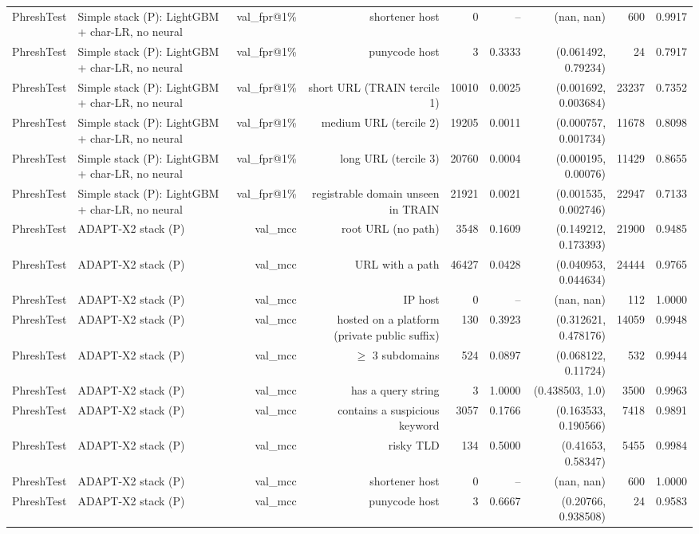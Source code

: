 \begin{table}[t]
\begin{tabular}{llrrrrrrr}
PhreshTest & Simple stack (P): LightGBM + char-LR, no neural & val\_fpr@1\% & shortener host & 0 & -- & (nan, nan) & 600 & 0.9917 \\
PhreshTest & Simple stack (P): LightGBM + char-LR, no neural & val\_fpr@1\% & punycode host & 3 & 0.3333 & (0.061492, 0.79234) & 24 & 0.7917 \\
PhreshTest & Simple stack (P): LightGBM + char-LR, no neural & val\_fpr@1\% & short URL (TRAIN tercile 1) & 10010 & 0.0025 & (0.001692, 0.003684) & 23237 & 0.7352 \\
PhreshTest & Simple stack (P): LightGBM + char-LR, no neural & val\_fpr@1\% & medium URL (tercile 2) & 19205 & 0.0011 & (0.000757, 0.001734) & 11678 & 0.8098 \\
PhreshTest & Simple stack (P): LightGBM + char-LR, no neural & val\_fpr@1\% & long URL (tercile 3) & 20760 & 0.0004 & (0.000195, 0.00076) & 11429 & 0.8655 \\
PhreshTest & Simple stack (P): LightGBM + char-LR, no neural & val\_fpr@1\% & registrable domain unseen in TRAIN & 21921 & 0.0021 & (0.001535, 0.002746) & 22947 & 0.7133 \\
PhreshTest & ADAPT-X2 stack (P) & val\_mcc & root URL (no path) & 3548 & 0.1609 & (0.149212, 0.173393) & 21900 & 0.9485 \\
PhreshTest & ADAPT-X2 stack (P) & val\_mcc & URL with a path & 46427 & 0.0428 & (0.040953, 0.044634) & 24444 & 0.9765 \\
PhreshTest & ADAPT-X2 stack (P) & val\_mcc & IP host & 0 & -- & (nan, nan) & 112 & 1.0000 \\
PhreshTest & ADAPT-X2 stack (P) & val\_mcc & hosted on a platform (private public suffix) & 130 & 0.3923 & (0.312621, 0.478176) & 14059 & 0.9948 \\
PhreshTest & ADAPT-X2 stack (P) & val\_mcc & $\geq$ 3 subdomains & 524 & 0.0897 & (0.068122, 0.11724) & 532 & 0.9944 \\
PhreshTest & ADAPT-X2 stack (P) & val\_mcc & has a query string & 3 & 1.0000 & (0.438503, 1.0) & 3500 & 0.9963 \\
PhreshTest & ADAPT-X2 stack (P) & val\_mcc & contains a suspicious keyword & 3057 & 0.1766 & (0.163533, 0.190566) & 7418 & 0.9891 \\
PhreshTest & ADAPT-X2 stack (P) & val\_mcc & risky TLD & 134 & 0.5000 & (0.41653, 0.58347) & 5455 & 0.9984 \\
PhreshTest & ADAPT-X2 stack (P) & val\_mcc & shortener host & 0 & -- & (nan, nan) & 600 & 1.0000 \\
PhreshTest & ADAPT-X2 stack (P) & val\_mcc & punycode host & 3 & 0.6667 & (0.20766, 0.938508) & 24 & 0.9583 \\

\end{tabular}
\end{table}
